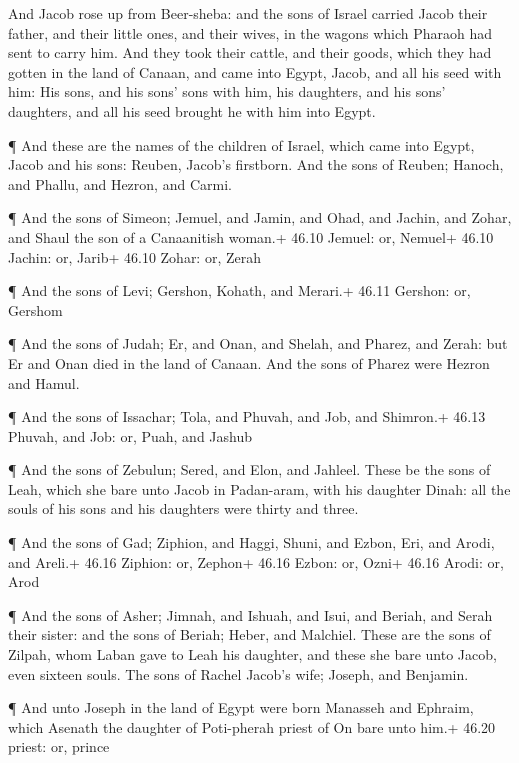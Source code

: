  And Jacob rose up from Beer-sheba: and the sons of Israel
carried Jacob their father, and their little ones, and their wives, in
the wagons which Pharaoh had sent to carry him.  And they
took their cattle, and their goods, which they had gotten in the land of
Canaan, and came into Egypt, Jacob, and all his seed with him:
 His sons, and his sons' sons with him, his daughters, and
his sons' daughters, and all his seed brought he with him into Egypt.

 ¶ And these are the names of the children of Israel, which
came into Egypt, Jacob and his sons: Reuben, Jacob's firstborn.
 And the sons of Reuben; Hanoch, and Phallu, and Hezron, and
Carmi.

 ¶ And the sons of Simeon; Jemuel, and Jamin, and Ohad, and
Jachin, and Zohar, and Shaul the son of a Canaanitish woman.+ 46.10
Jemuel: or, Nemuel+ 46.10 Jachin: or, Jarib+ 46.10 Zohar: or, Zerah

 ¶ And the sons of Levi; Gershon, Kohath, and Merari.+
46.11 Gershon: or, Gershom

 ¶ And the sons of Judah; Er, and Onan, and Shelah, and
Pharez, and Zerah: but Er and Onan died in the land of Canaan. And the
sons of Pharez were Hezron and Hamul.

 ¶ And the sons of Issachar; Tola, and Phuvah, and Job, and
Shimron.+ 46.13 Phuvah, and Job: or, Puah, and Jashub

 ¶ And the sons of Zebulun; Sered, and Elon, and Jahleel.
 These be the sons of Leah, which she bare unto Jacob in
Padan-aram, with his daughter Dinah: all the souls of his sons and his
daughters were thirty and three.

 ¶ And the sons of Gad; Ziphion, and Haggi, Shuni, and
Ezbon, Eri, and Arodi, and Areli.+ 46.16 Ziphion: or, Zephon+ 46.16
Ezbon: or, Ozni+ 46.16 Arodi: or, Arod

 ¶ And the sons of Asher; Jimnah, and Ishuah, and Isui, and
Beriah, and Serah their sister: and the sons of Beriah; Heber, and
Malchiel.  These are the sons of Zilpah, whom Laban gave to
Leah his daughter, and these she bare unto Jacob, even sixteen souls.
 The sons of Rachel Jacob's wife; Joseph, and Benjamin.

 ¶ And unto Joseph in the land of Egypt were born Manasseh
and Ephraim, which Asenath the daughter of Poti-pherah priest of On bare
unto him.+ 46.20 priest: or, prince

